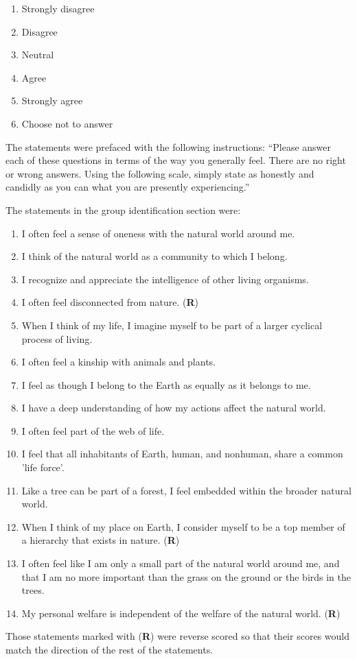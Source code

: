 \begin{enumerate}
	\item Strongly disagree
	\item Disagree
	\item Neutral
	\item Agree
	\item Strongly agree
	\item Choose not to answer
\end{enumerate}

The statements were prefaced with the following instructions: ``Please answer each of these questions in terms of the way you generally feel. There are no right or wrong answers. Using the following scale, simply state as honestly and candidly as you can what you are presently experiencing.''

The statements in the group identification section were:

\begin{enumerate}
	\item I often feel a sense of oneness with the natural world around me.
	\item I think of the natural world as a community to which I belong.
	\item I recognize and appreciate the intelligence of other living organisms.
	\item I often feel disconnected from nature. (\textbf{R})
	\item When I think of my life, I imagine myself to be part of a larger cyclical process of living.
	\item I often feel a kinship with animals and plants.
	\item I feel as though I belong to the Earth as equally as it belongs to me.
	\item I have a deep understanding of how my actions affect the natural world.
	\item I often feel part of the web of life.
	\item I feel that all inhabitants of Earth, human, and nonhuman, share a common 'life force'.
	\item Like a tree can be part of a forest, I feel embedded within the broader natural world.
	\item When I think of my place on Earth, I consider myself to be a top member of a hierarchy that exists in nature. (\textbf{R})
	\item I often feel like I am only a small part of the natural world around me, and that I am no more important than the grass on the ground or the birds in the trees.
	\item My personal welfare is independent of the welfare of the natural world. (\textbf{R})
\end{enumerate}

Those statements marked with (\textbf{R}) were reverse scored so that their scores would match the direction of the rest of the statements.
